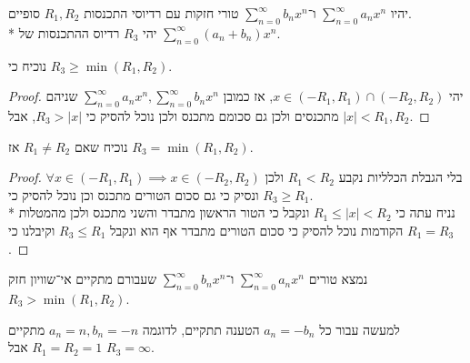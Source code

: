 \Question{}
יהיו $\sum_{n = 0}^{\infty} a_n x^n$ ו־$\sum_{n = 0}^{\infty} b_n x^n$ טורי חזקות עם רדיוסי התכנסות $R_1, R_2$ סופיים. \\*
יהי $R_3$ רדיוס ההתכנסות של $\sum_{n = 0}^{\infty} (a_n + b_n) x^n$.

\Subquestion{}
נוכיח כי $R_3 \ge \min(R_1, R_2)$.
\begin{proof}
	יהי $x \in (-R_1, R_1) \cap (-R_2, R_2)$, אז כמובן $\sum_{n = 0}^{\infty} a_n x^n, \sum_{n = 0}^{\infty} b_n x^n$ שניהם מתכנסים ולכן גם סכומם מתכנס ולכן נוכל להסיק כי $R_3 > |x|$, אבל $|x| < R_1, R_2$.
\end{proof}

\Subquestion{}
נוכיח שאם $R_1 \ne R_2$ אז $R_3 = \min(R_1, R_2)$.
\begin{proof}
	בלי הגבלת הכלליות נקבע $R_1 < R_2$ ולכן $\forall x \in (-R_1, R_1) \implies x \in (-R_2, R_2)$ ונסיק כי גם סכום הטורים מתכנס וכן נוכל להסיק כי $R_3 \ge R_1$. \\*
	נניח עתה כי $R_1 \le |x| < R_2$ ונקבל כי הטור הראשון מתבדר והשני מתכנס ולכן מהמטלות הקודמות נוכל להסיק כי סכום הטורים מתבדר אף הוא ונקבל $R_3 \le R_1$ וקיבלנו כי $R_1 = R_3$.
\end{proof}

\Subquestion{}
נמצא טורים $\sum_{n = 0}^{\infty} a_n x^n$ ו־$\sum_{n = 0}^{\infty} b_n x^n$ שעבורם מתקיים אי־שוויון חזק $R_3 > \min(R_1, R_2)$.

למעשה עבור כל $a_n = -b_n$ הטענה תתקיים, לדוגמה $a_n = n, b_n = -n$ מתקיים $R_1 = R_2 = 1$ אבל $R_3 = \infty$.

